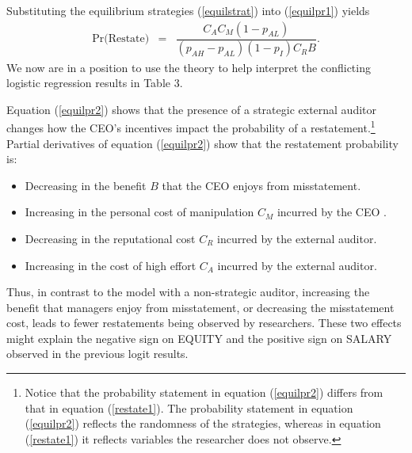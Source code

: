 Substituting the equilibrium strategies (\ref{equilstrat}) into (\ref{equilpr1}) yields
\begin{equation} \label{equilpr2}
\begin{array}{lcl}
\mbox{Pr(Restate)}& = &  \dfrac{C_AC_M(1-p_{AL})}{(p_{AH}-p_{AL})(1-p_I)C_RB}.
\end{array}\end{equation}
We now are in a position to use the theory to help interpret the conflicting logistic regression results
in Table 3. 

Equation (\ref{equilpr2}) shows that the presence of a strategic external auditor
changes how the CEO's incentives impact the probability of a restatement.\footnote{Notice that
the probability statement in equation  (\ref{equilpr2})  differs from that in equation (\ref{restate1}).
The probability statement in equation  (\ref{equilpr2}) reflects the randomness of the strategies, whereas in equation (\ref{restate1}) it reflects variables the researcher does not observe.} 
Partial derivatives of equation (\ref{equilpr2}) show that the restatement probability is:
\begin{itemize}
\item Decreasing in the benefit $B$ that the CEO enjoys from misstatement.
\item Increasing in the personal cost of manipulation $C_M$ incurred by the CEO .
\item Decreasing in the reputational cost $C_R$ incurred by the external auditor.
\item Increasing in the cost of high effort $C_A$ incurred by the external auditor.
\end{itemize}

Thus, in contrast to the model with a non-strategic auditor, increasing the benefit that managers enjoy from misstatement, or decreasing the misstatement cost, leads to fewer restatements being observed by researchers.
These two effects might explain the negative sign on EQUITY and the positive sign on SALARY observed in the previous logit results. 


